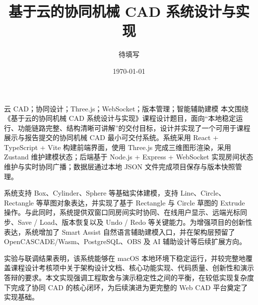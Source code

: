 \documentclass[supercite,macfont]{HustGSClassPaper}
\title{基于云的协同机械 CAD 系统设计与实现}
\author{待填写}
\date{\today}
\begin{document}
\maketitle

\clearpage
{}

\begin{cnabstract}{云 CAD；协同设计；Three.js；WebSocket；版本管理；智能辅助建模}
本文围绕《基于云的协同机械 CAD 系统设计与实现》课程设计题目，面向“本地稳定运行、功能链路完整、结构清晰可讲解”的交付目标，设计并实现了一个可用于课程展示与报告提交的协同机械 CAD 最小可交付系统。系统采用 React + TypeScript + Vite 构建前端界面，使用 Three.js 完成三维图形渲染，采用 Zustand 维护建模状态；后端基于 Node.js + Express + WebSocket 实现房间状态维护与实时协同广播；数据层通过本地 JSON 文件完成项目保存与版本快照管理。

系统支持 Box、Cylinder、Sphere 等基础实体建模，支持 Line、Circle、Rectangle 等草图对象表达，并实现了基于 Rectangle 与 Circle 草图的 Extrude 操作。与此同时，系统提供双窗口同房间实时协同、在线用户显示、远端光标同步、Save / Load、版本恢复以及 Undo / Redo 等关键能力。为增强项目的创新性表达，系统增加了 Smart Assist 自然语言辅助建模入口，并在架构层预留了 OpenCASCADE/Wasm、PostgreSQL、OBS 及 AI 辅助设计等后续扩展方向。

实验与联调结果表明，该系统能够在 macOS 本地环境下稳定运行，并较完整地覆盖课程设计考核项中关于架构设计文档、核心功能实现、代码质量、创新性和演示答辩的要求。本文实现强调工程取舍与演示稳定性之间的平衡，在较低实现复杂度下完成了协同 CAD 的核心闭环，为后续演进为更完整的 Web CAD 平台奠定了实现基础。
\end{cnabstract}
\end{document}
